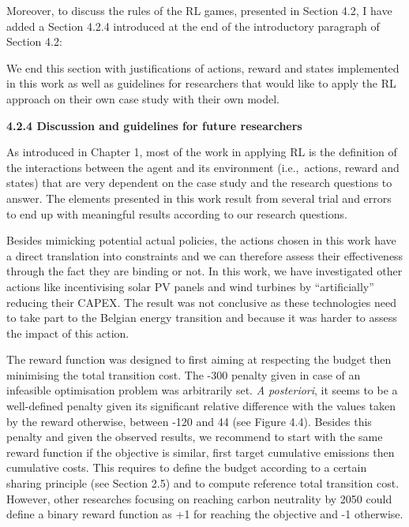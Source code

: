 \documentclass[12pt,a4paper]{article}
\def\ie{i.e.,\ }
\begin{document}
Moreover, to discuss the rules of the RL games, presented in Section 4.2, I have added {\color{blue}a Section 4.2.4} introduced {\color{blue}at the end of the introductory paragraph of Section 4.2}:

\begin{mdframed}[style=manuscript] %
We end this section with justifications of actions, reward and states implemented in this work as well as guidelines for researchers that would like to apply the RL approach on their own case study with their own model.
\end{mdframed}

\begin{mdframed}[style=manuscript] %
\textbf{4.2.4 Discussion and guidelines for future researchers}

As introduced in Chapter 1, most of the work in applying RL is the definition of the interactions between the agent and its environment (\ie actions, reward and states) that are very dependent on the case study and the research questions to answer. The elements presented in this work result from several trial and errors to end up with meaningful results according to our research questions.

Besides mimicking potential actual policies, the actions chosen in this work have a direct translation into constraints and we can therefore assess their effectiveness through the fact they are binding or not. In this work, we have investigated other actions like incentivising solar PV panels and wind turbines by ``artificially'' reducing their CAPEX. The result was not conclusive as these technologies need to take part to the Belgian energy transition and because it was harder to assess the impact of this action. 

The reward function was designed to first aiming at respecting the  budget then minimising the total transition cost. The -300 penalty given in case of an infeasible optimisation problem was arbitrarily set. \textit{A posteriori}, it seems to be a well-defined penalty given its significant relative difference with the values taken by the reward otherwise, between -120 and 44 (see Figure 4.4). Besides this penalty and given the observed results, we recommend to start with the same reward function if the objective is similar, first target cumulative emissions then cumulative costs. This requires to define the  budget according to a certain sharing principle (see Section 2.5) and to compute reference total transition cost. However, other researches focusing on reaching carbon neutrality by 2050 could define a binary reward function as +1 for reaching the objective and -1 otherwise.


\end{mdframed}
\end{document}
